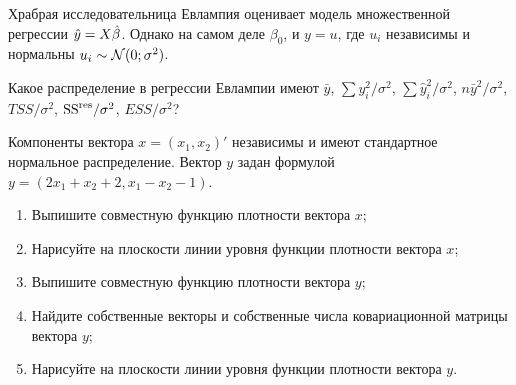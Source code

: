 \begin{problem}
Храбрая исследовательница Евлампия оценивает модель
множественной регрессии $\hat{y} = X\hat{\beta}$.
Однако на самом деле $\beta_0$, и $y=u$,
где $u_i$ независимы и нормальны $u_i \sim \mathcal{N}(0;\sigma^2)$.

Какое распределение в регрессии Евлампии имеют $\bar y$, $\sum y_i^2/\sigma^2$,
$\sum \hat y_i^2/\sigma^2$,
$n\bar y^2/\sigma^2$, $TSS/\sigma^2$, $\mathrm{SS}^{\text{res}}/\sigma^2$, $ESS/\sigma^2$?
\begin{sol}

\end{sol}
\end{problem}



\begin{problem}
Компоненты вектора $x=(x_1, x_2)'$ независимы и имеют стандартное нормальное распределение. Вектор $y$ задан формулой $y = (2x_1 + x_2 + 2, x_1 - x_2 - 1)$.
\begin{enumerate}
  \item Выпишите совместную функцию плотности вектора $x$;
  \item Нарисуйте на плоскости линии уровня функции плотности вектора $x$;
  \item Выпишите совместную функцию плотности вектора $y$;
  \item Найдите собственные векторы и собственные числа ковариационной матрицы вектора $y$;
  \item Нарисуйте на плоскости линии уровня функции плотности вектора $y$.
\end{enumerate}
\begin{sol}
\end{sol}
\end{problem}


